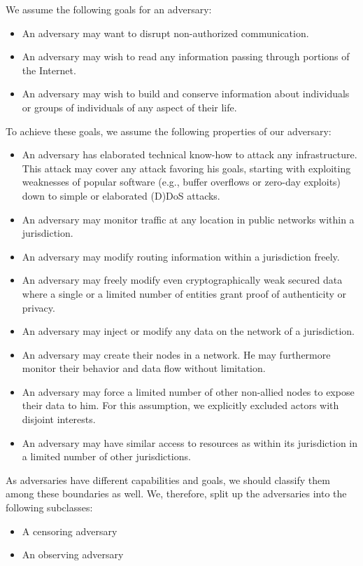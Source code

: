 We assume the following goals for an adversary:
\begin{itemize}
	\item An adversary may want to disrupt non-authorized communication.
	\item An adversary may wish to read any information passing through portions of the Internet.
	\item An adversary may wish to build and conserve information about individuals or groups of individuals of any aspect of their life. 
\end{itemize}

To achieve these goals, we assume the following properties of our adversary:
\begin{itemize}
	\item An adversary has elaborated technical know-how to attack any infrastructure. This attack may cover any attack favoring his goals, starting with exploiting weaknesses of popular software (e.g., buffer overflows or zero-day exploits) down to simple or elaborated (D)DoS attacks.
	\item An adversary may monitor traffic at any location in public networks within a jurisdiction.
	\item An adversary may modify routing information within a jurisdiction freely.
	\item An adversary may freely modify even cryptographically weak secured data where a single or a limited number of entities grant proof of authenticity or privacy.
	\item An adversary may inject or modify any data on the network of a jurisdiction.
	\item An adversary may create their nodes in a network. He may furthermore monitor their behavior and data flow without limitation.
	\item An adversary may force a limited number of other non-allied nodes to expose their data to him. For this assumption, we explicitly excluded actors with disjoint interests.
	\item An adversary may have similar access to resources as within its jurisdiction in a limited number of other jurisdictions.
\end{itemize}

As adversaries have different capabilities and goals, we should classify them among these boundaries as well. We, therefore, split up the adversaries into the following subclasses:
\begin{itemize}
	\item A censoring adversary
	\item An observing adversary
\end{itemize}

